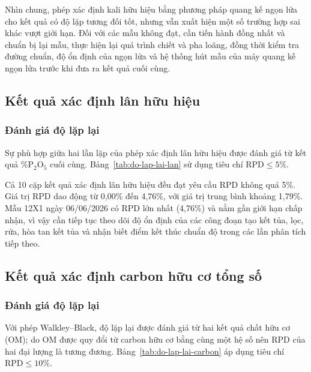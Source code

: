 Nhìn chung, phép xác định kali hữu hiệu bằng phương pháp quang kế ngọn lửa cho kết quả có độ lặp tương đối tốt, nhưng vẫn xuất hiện một số trường hợp sai khác vượt giới hạn.
Đối với các mẫu không đạt, cần tiến hành đồng nhất và chuẩn bị lại mẫu, thực hiện lại quá trình chiết và pha loãng, đồng thời kiểm tra đường chuẩn, độ ổn định của ngọn lửa và hệ thống hút mẫu của máy quang kế ngọn lửa trước khi đưa ra kết quả cuối cùng.

\subsection{Kết quả xác định lân hữu hiệu}
\PhosphorusResultsTable

\subsubsection{Đánh giá độ lặp lại}
Sự phù hợp giữa hai lần lặp của phép xác định lân hữu hiệu được đánh giá từ kết quả \(\%\mathrm{P_2O_5}\) cuối cùng. Bảng~\ref{tab:do-lap-lai-lan} sử dụng tiêu chí $\mathrm{RPD}\leq5\%$.

{\scriptsize
\setlength{\tabcolsep}{3pt}
\renewcommand{\arraystretch}{1.2}

}

Cả 10 cặp kết quả xác định lân hữu hiệu đều đạt yêu cầu RPD không quá 5\%.
Giá trị RPD dao động từ 0,00\% đến 4,76\%, với giá trị trung bình khoảng 1,79\%.
Mẫu 12X1 ngày 06/06/2026 có RPD lớn nhất (4,76\%) và nằm gần giới hạn chấp nhận, vì vậy cần tiếp tục theo dõi độ ổn định của các công đoạn tạo kết tủa, lọc, rửa, hòa tan kết tủa và nhận biết điểm kết thúc chuẩn độ trong các lần phân tích tiếp theo.

\subsection{Kết quả xác định carbon hữu cơ tổng số}
\CarbonResultsTable

\subsubsection{Đánh giá độ lặp lại}
Với phép Walkley--Black, độ lặp lại được đánh giá từ hai kết quả chất hữu cơ (OM); do OM được quy đổi từ carbon hữu cơ bằng cùng một hệ số nên RPD của hai đại lượng là tương đương. Bảng~\ref{tab:do-lap-lai-carbon} áp dụng tiêu chí $\mathrm{RPD}\leq10\%$.



